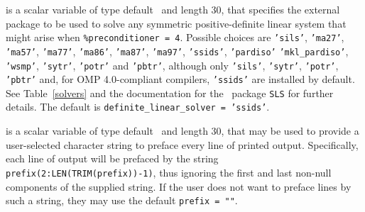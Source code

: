 \documentclass{galahad}
\begin{document}
\begin{description}
 is a scalar variable of type default \character\
and length 30, that specifies the external package to be used to
solve any symmetric positive-definite linear system that might arise
when {\tt \%precondit\-ioner = 4}. Possible choices are
{\tt 'sils'},
{\tt 'ma27'},
{\tt 'ma57'},
{\tt 'ma77'},
{\tt 'ma86'},
{\tt 'ma87'},
{\tt 'ma97'},
{\tt 'ssids'},
{\tt 'pardiso'}
{\tt 'mkl\_pardiso'},
{\tt 'wsmp'},
{\tt 'sytr'},
{\tt 'potr'} and
{\tt 'pbtr'},
although only {\tt 'sils'}, {\tt 'sytr'}, {\tt 'potr'}, {\tt 'pbtr'}
and, for OMP 4.0-compliant compilers,
{\tt 'ssids'} are installed by default.
See Table~\ref{solvers} and
the documentation for the \galahad\ package {\tt SLS} for further details.
The default is {\tt definite\_linear\_solver = 'ssids'}.

 is a scalar variable of type default \character\
and length 30, that may be used to provide a user-selected
character string to preface every line of printed output.
Specifically, each line of output will be prefaced by the string
{\tt prefix(2:LEN(TRIM(prefix))-1)},
thus ignoring the first and last non-null components of the
supplied string. If the user does not want to preface lines by such
a string, they may use the default {\tt prefix = ""}.

\end{description}

\end{document}
